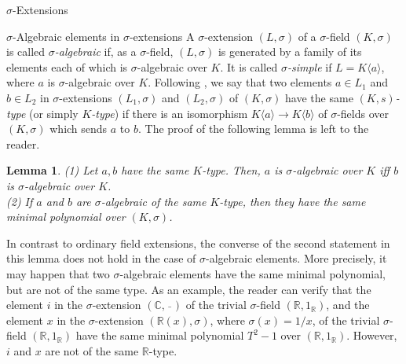 \documentclass[11pt,a4paper]{article}
\theoremstyle{theorem}
\newtheorem{lemma}[theorem]{Lemma}
\numberwithin{equation}{section}
\newcommand{\s}{\sigma}
\begin{document}
\begin{section}{$\s$-Extensions}
\begin{subsection}{$\s$-Algebraic elements in $\s$-extensions }
	A $\s$-extension $(L,\s)$ of a $\s$-field $(K,\s)$ is called \textit{$\s$-algebraic} if, as a $\s$-field, $(L,\s)$ is generated by a family of its elements each of which is $\s$-algebraic over $K$. It is called \textit{$\s$-simple} if $L=K\langle a\rangle$, where $a$ is $\s$-algebraic over $K$. Following \cite{treur1989separate}, we say that two elements $a\in L_1$ and $b\in L_2$ in $\s$-extensions $(L_1,\s)$ and $(L_2,\s)$ of $(K,\s)$  have the same \textit{$(K,s)$-type }(or simply \textit{$K$-type}) if there is an isomorphism $K\langle a \rangle\to K\langle b \rangle$ of $\s$-fields over  $(K,\s)$ which sends $a$ to $b$. The proof of the following lemma is left to the reader. 
	\begin{lemma}\label{SameKtype}
		(1) Let $a,b$ have the same $K$-type. Then, $a$ is $\s$-algebraic over $K$ iff $b$ is $\s$-algebraic over $K$. \\
		(2) If $a$ and $b$ are $\s$-algebraic of the same $K$-type, then they have the same minimal polynomial over $(K,\s)$.
	\end{lemma}
	In contrast to ordinary field extensions, the converse of the second statement in this lemma does not hold in the case of $\s$-algebraic elements. More precisely, it may happen that two  $\s$-algebraic elements have the same minimal polynomial, but are not of the same type. As an example, the reader can verify that the element $i$ in  the $\s$-extension  $(\mathbb{C},\,\bar\, \,)$ of the trivial $\s$-field $(\mathbb{R},1_\mathbb{R})$, and the element $x$ in the  $\s$-extension  $(\mathbb{R}(x),\s)$, where $\s(x)=1/x$, of the trivial $\s$-field $(\mathbb{R},1_\mathbb{R})$ have the same minimal polynomial $T^2-1$ over $(\mathbb{R},1_\mathbb{R})$. However, $i$ and $x$ are not of the same $\mathbb{R}$-type. 


\end{subsection}
\end{section}
\end{document}
